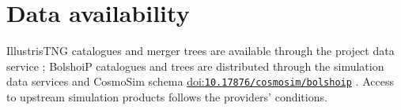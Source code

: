 \documentclass[11pt,a4paper]{article}
\newcommand{\doi}[1]{\href{https://doi.org/#1}{doi:\nolinkurl{#1}}}
\begin{document}
\section*{Data availability}
\AnalysisAvailability{} IllustrisTNG catalogues and merger trees are available through the project data service \citep{Nelson2019,TNGSpec}; BolshoiP catalogues and trees are distributed through the simulation data services and CosmoSim schema \doi{10.17876/cosmosim/bolshoip} \citep{CosmoBolshoiP}. Access to upstream simulation products follows the providers' conditions.

{\small\setlength{\bibsep}{1.5pt}}
\end{document}
